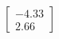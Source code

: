 \documentclass[preview]{standalone}
\begin{document}
\begin{align*}
\begin{bmatrix} -4.33 \\ 2.66 \end{bmatrix}
\end{align*}
\end{document}
